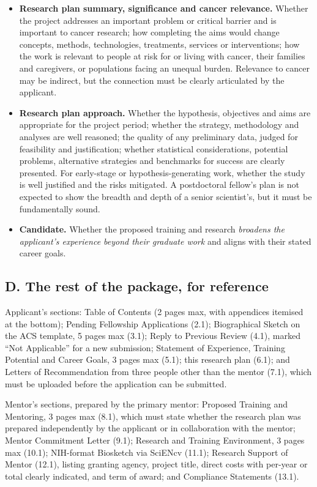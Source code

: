 \begin{itemize}
\item \textbf{Research plan summary, significance and cancer relevance.}
  Whether the project addresses an important problem or critical barrier and is
  important to cancer research; how completing the aims would change concepts,
  methods, technologies, treatments, services or interventions; how the work is
  relevant to people at risk for or living with cancer, their families and
  caregivers, or populations facing an unequal burden. Relevance to cancer may
  be indirect, but the connection must be clearly articulated by the applicant.
\item \textbf{Research plan approach.} Whether the hypothesis, objectives and
  aims are appropriate for the project period; whether the strategy,
  methodology and analyses are well reasoned; the quality of any preliminary
  data, judged for feasibility and justification; whether statistical
  considerations, potential problems, alternative strategies and benchmarks for
  success are clearly presented. For early-stage or hypothesis-generating work,
  whether the study is well justified and the risks mitigated. A postdoctoral
  fellow's plan is not expected to show the breadth and depth of a senior
  scientist's, but it must be fundamentally sound.
\item \textbf{Candidate.} Whether the proposed training and research
  \emph{broadens the applicant's experience beyond their graduate work} and
  aligns with their stated career goals.
\end{itemize}

\subsection*{D. The rest of the package, for reference}

Applicant's sections: Table of Contents (2 pages max, with appendices itemised
at the bottom); Pending Fellowship Applications (2.1); Biographical Sketch on
the ACS template, 5 pages max (3.1); Reply to Previous Review (4.1), marked
``Not Applicable'' for a new submission; Statement of Experience, Training
Potential and Career Goals, 3 pages max (5.1); this research plan (6.1); and
Letters of Recommendation from three people other than the mentor (7.1), which
must be uploaded before the application can be submitted.

Mentor's sections, prepared by the primary mentor: Proposed Training and
Mentoring, 3 pages max (8.1), which must state whether the research plan was
prepared independently by the applicant or in collaboration with the mentor;
Mentor Commitment Letter (9.1); Research and Training Environment, 3 pages max
(10.1); NIH-format Biosketch via SciENcv (11.1); Research Support of Mentor
(12.1), listing granting agency, project title, direct costs with per-year or
total clearly indicated, and term of award; and Compliance Statements (13.1).

